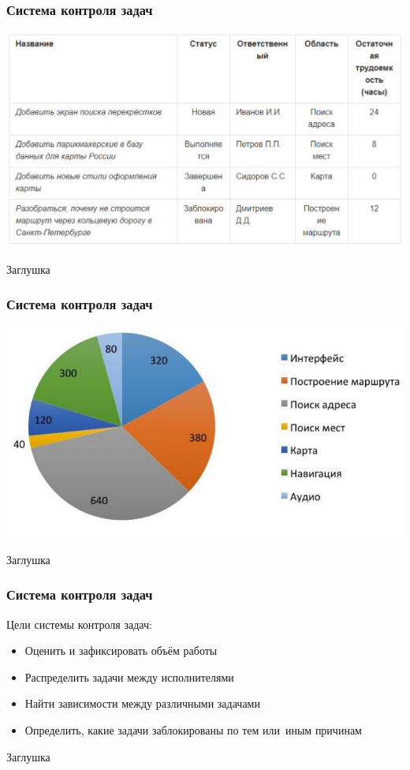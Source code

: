 \documentclass{../industrial-development}
\begin{document}
    \begin{frame} \frametitle{Система контроля задач}
        \centerline{\includegraphics[width=1\textwidth]{gpstable.pdf}}
    \end{frame}
    \lecturenotes
    Заглушка

    \begin{frame} \frametitle{Система контроля задач}
        \centerline{\includegraphics[width=1\textwidth]{circle.pdf}}
    \end{frame}
    \lecturenotes
    Заглушка
    
    \begin{frame} \frametitle{Система контроля задач}
        Цели системы контроля задач:
        \begin{itemize}
            \item Оценить и зафиксировать объём работы
            \item Распределить задачи между исполнителями
            \item Найти зависимости между различными задачами
            \item Определить, какие задачи заблокированы по тем или~иным причинам
        \end{itemize}
    \end{frame}
    \lecturenotes
    Заглушка
\end{document}
